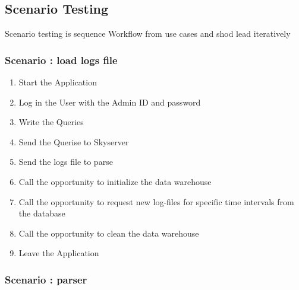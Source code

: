 \subsection{Scenario Testing}

Scenario testing is sequence Workflow from use cases and shod lead iteratively

\renewcommand{\theenumi}{/T\arabic{enumi}0/}
\renewcommand{\labelenumi}{\theenumi}

\subsubsection {Scenario : load logs file} 

\begin{enumerate}

\item Start the Application

\item Log in the User with the Admin ID and password

\item Write the Queries

\item Send the Querise to Skyserver

\item Send the logs file to parse

\item Call the opportunity to initialize the data warehouse

\item Call the opportunity to request new log-files for specific time intervals from the
database

\item Call the opportunity to clean the data warehouse %

\item Leave the Application

\end{enumerate}

\subsubsection {Scenario : parser} 

